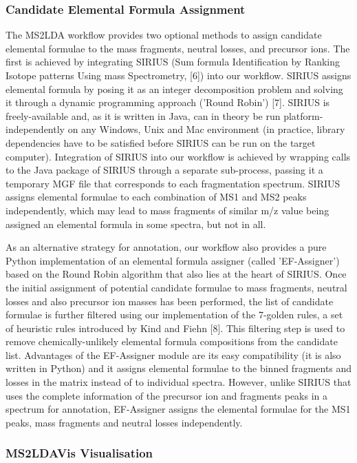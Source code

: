 \subsubsection{Candidate Elemental Formula Assignment}

The MS2LDA workflow provides two optional methods to assign candidate elemental formulae to the mass fragments, neutral losses, and precursor ions. The first is achieved by integrating SIRIUS (Sum formula Identification by Ranking Isotope patterns Using mass Spectrometry, [6]) into our workflow. SIRIUS assigns elemental formula by posing it as an integer decomposition problem and solving it through a dynamic programming approach ('Round Robin') [7]. SIRIUS is freely-available and, as it is written in Java, can in theory be run platform-independently on any Windows, Unix and Mac environment (in practice, library dependencies have to be satisfied before SIRIUS can be run on the target computer). Integration of SIRIUS into our workflow is achieved by wrapping calls to the Java package of SIRIUS through a separate sub-process, passing it a temporary MGF file that corresponds to each fragmentation spectrum. SIRIUS assigns elemental formulae to each combination of MS1 and MS2 peaks independently, which may lead to mass fragments of similar m/z value being assigned an elemental formula in some spectra, but not in all.

As an alternative strategy for annotation, our workflow also provides a pure Python implementation of an elemental formula assigner (called 'EF-Assigner') based on the Round Robin algorithm that also lies at the heart of SIRIUS. Once the initial assignment of potential candidate formulae to mass fragments, neutral losses and also precursor ion masses has been performed, the list of candidate formulae is further filtered using our implementation of the 7-golden rules, a set of heuristic rules introduced by Kind and Fiehn [8]. This filtering step is used to remove chemically-unlikely elemental formula compositions from the candidate list. Advantages of the EF-Assigner module are its easy compatibility (it is also written in Python) and it assigns elemental formulae to the binned fragments and losses in the matrix instead of to individual spectra. However, unlike SIRIUS that uses the complete information of the precursor ion and fragments peaks in a spectrum for annotation, EF-Assigner assigns the elemental formulae for the MS1 peaks, mass fragments and neutral losses independently. 

\subsubsection{MS2LDAVis Visualisation}

